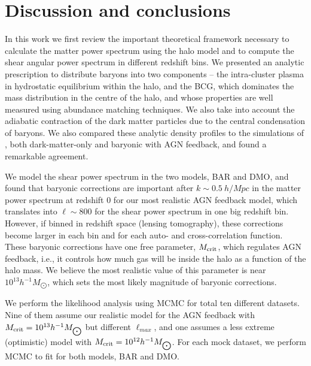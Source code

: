 \documentclass[
  11pt,
  twoside,
  openright,
  titlepage,
  headings=optiontoheadandtoc
]{scrbook}
\begin{document}



\section{Discussion and conclusions}
\label{p3:sec:discussion}


In this work we first review the important theoretical framework necessary to calculate the matter power spectrum using the halo model and to compute the shear angular power spectrum in different redshift bins. We presented an analytic prescription to distribute baryons into two components -- the intra-cluster plasma in hydrostatic equilibrium within the halo, and the BCG, which dominates the mass distribution in the centre of the halo, and whose properties are well measured using abundance matching techniques. We also take into account the adiabatic contraction of the dark matter particles due to the central condensation of  baryons. We also compared these analytic density profiles to the simulations of \cite{2014MNRAS.440.2290M}, both dark-matter-only and baryonic with AGN feedback, and found a remarkable agreement. 

We model the shear power spectrum in the two models, BAR and DMO, and found that baryonic corrections are important after $k \sim 0.5\ h/Mpc$ in the matter power spectrum at redshift 0 for our most realistic AGN feedback model, which translates into $\ell \sim 800$ for the shear power spectrum in one big redshift bin. However, if binned in redshift space (lensing tomography), these corrections become larger in each bin and for each auto- and cross-correlation function. These baryonic corrections have one free parameter, $M_{\rm crit}$, which regulates AGN feedback, i.e., it controls how much gas will be inside the halo as a function of the halo mass. We believe the most realistic value of this parameter is near $10^{13} h^{-1}M_{\bigodot}$, which sets the most likely magnitude of  baryonic corrections.

We perform the likelihood analysis using MCMC for total ten different datasets. Nine of them assume our realistic model for the AGN feedback with $M_{\rm crit} = 10^{13} h^{-1}M_{\bigodot}$ but different $\ell_{max}$, and one assumes a less extreme (optimistic) model with $M_{\rm crit} = 10^{12} h^{-1}M_{\bigodot}$. For each mock dataset, we perform MCMC to fit for both models, BAR and DMO.
\end{document}
